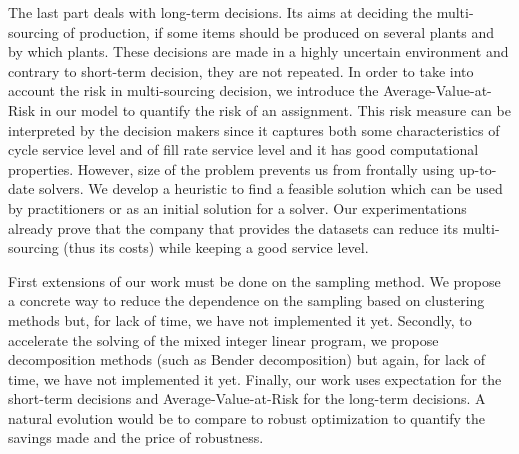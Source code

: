 The last part deals with long-term decisions.
Its aims at deciding the multi-sourcing of production, \ie if some items should be produced on several plants and by which plants.
These decisions are made in a highly uncertain environment and contrary to short-term decision, they are not repeated.
In order to take into account the risk in multi-sourcing decision, we introduce the Average-Value-at-Risk in our model to quantify the risk of an assignment.
This risk measure can be interpreted by the decision makers since it captures both some characteristics of cycle service level and of fill rate service level and it has good computational properties.
However, size of the problem prevents us from frontally using up-to-date solvers.
We develop a heuristic to find a feasible solution which can be used by practitioners or as an initial solution for a solver.
Our experimentations already prove that the company that provides the datasets can reduce its multi-sourcing (thus its costs) while keeping a good service level.


First extensions of our work must be done on the sampling method.
We propose a concrete way to reduce the dependence on the sampling based on clustering methods but, for lack of time, we have not implemented it yet.
Secondly, to accelerate the solving of the mixed integer linear program, we propose decomposition methods (such as Bender decomposition) but again, for lack of time, we have not implemented it yet.
Finally, our work uses expectation for the short-term decisions and Average-Value-at-Risk for the long-term decisions.
A natural evolution would be to compare to robust optimization to quantify the savings made and the price of robustness.

